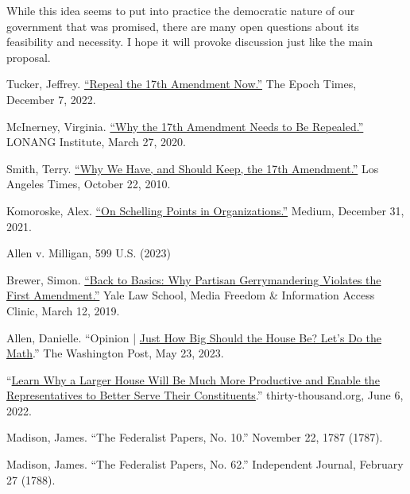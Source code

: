 \documentclass{article}
\newcommand{\quotes}[1]{``#1''}
\begin{document}
While this idea seems to put into practice the democratic nature of our government that was promised, there are many open questions about its feasibility and necessity. I hope it will provoke discussion just like the main proposal.

\begin{thebibliography}{20}
Tucker, Jeffrey. \href{https://www.theepochtimes.com/repeal-the-17th-amendment-now\_4909126.html}{\quotes{Repeal the 17th Amendment Now.}} The Epoch Times, December 7, 2022.

McInerney, Virginia. \href{https://lonang.com/commentaries/conlaw/federalism/repeal-seventeenth-amendment/}{\quotes{Why the 17th Amendment Needs to Be Repealed.}} LONANG Institute, March 27, 2020.

Smith, Terry. \href{https://www.latimes.com/archives/la-xpm-2010-oct-22-la-oew-smith-17th-amendment-20101022-story.html}{\quotes{Why We Have, and Should Keep, the 17th Amendment.}} Los Angeles Times, October 22, 2010.

Komoroske, Alex. \href{https://medium.com/@komorama/on-schelling-points-in-organizations-e90647cdd81b}{\quotes{On Schelling Points in Organizations.}} Medium, December 31, 2021.

Allen v. Milligan, 599 U.S. (2023)

Brewer, Simon. \href{https://law.yale.edu/mfia/case-disclosed/back-basics-why-partisan-gerrymandering-violates-first-amendment}{\quotes{Back to Basics: Why Partisan Gerrymandering Violates the First Amendment.}} Yale Law School, Media Freedom \& Information Access Clinic, March 12, 2019.

Allen, Danielle. \quotes{Opinion | \href{https://www.washingtonpost.com/opinions/2023/03/28/danielle-allen-democracy-reform-house-representatives-districts/}{Just How Big Should the House Be? Let’s Do the Math}.} The Washington Post, May 23, 2023. 

 \quotes{\href{https://thirty-thousand.org/the-house-of-representatives-is-scalable/}{Learn Why a Larger House Will Be Much More Productive and Enable the Representatives to Better Serve Their Constituents}.} thirty-thousand.org, June 6, 2022.

Madison, James. \quotes{The Federalist Papers, No. 10.} November 22, 1787 (1787).

Madison, James. \quotes{The Federalist Papers, No. 62.} Independent Journal, February 27 (1788).


\end{thebibliography}
\end{document}
